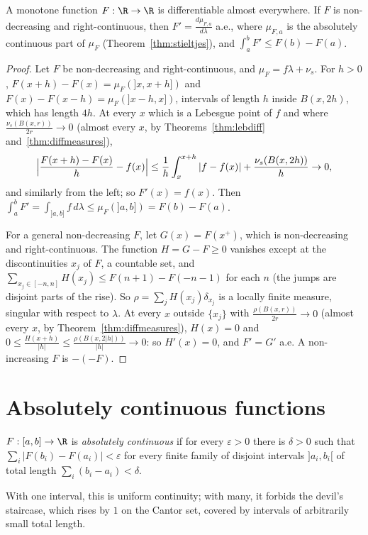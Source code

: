 \begin{theorem}[Lebesgue, 1904]\label{thm:monotone}
A monotone function $F:\R\to\R$ is differentiable almost everywhere. If $F$ is non-decreasing and right-continuous, then $F'=\frac{d\mu_{F,a}}{d\lambda}$ a.e., where $\mu_{F,a}$ is the absolutely continuous part of
$\mu_F$ (Theorem~\ref{thm:stieltjes}), and $\int_a^bF'\le F(b)-F(a)$.
\end{theorem}
\begin{proof}
Let $F$ be non-decreasing and right-continuous, and $\mu_F=f\lambda+\nu_s$. For $h>0$, $F(x+h)-F(x)=\mu_F(]x,x+h])$ and $F(x)-F(x-h)=\mu_F(]x-h,x])$, intervals of length $h$ inside $B(x,2h)$, which has length $4h$. At every $x$ which is a Lebesgue point of $f$ and where $\frac{\nu_s(B(x,r))}{2r}\to0$ (almost every $x$, by Theorems~\ref{thm:lebdiff} and~\ref{thm:diffmeasures}),
\[\Bigl|\frac{F(x+h)-F(x)}h-f(x)\Bigr|\le\frac1h\int_x^{x+h}|f-f(x)|+\frac{\nu_s(B(x,2h))}h\to0,\]
and similarly from the left; so $F'(x)=f(x)$. Then $\int_a^bF'=\int_{]a,b]}f\,d\lambda\le\mu_F(]a,b])=F(b)-F(a)$.

For a general non-decreasing $F$, let $G(x)=F(x^+)$, which is non-decreasing and right-continuous. The function $H=G-F\ge0$ vanishes except at the discontinuities $x_j$ of $F$, a countable set, and
$\sum_{x_j\in[-n,n]}H(x_j)\le F(n+1)-F(-n-1)$ for each $n$ (the jumps are disjoint parts of the rise). So $\rho=\sum_jH(x_j)\delta_{x_j}$ is a locally finite measure, singular with respect to $\lambda$. At every $x$
outside $\{x_j\}$ with $\frac{\rho(B(x,r))}{2r}\to0$ (almost every $x$, by Theorem~\ref{thm:diffmeasures}), $H(x)=0$ and $0\le\frac{H(x+h)}{|h|}\le\frac{\rho(B(x,2|h|))}{|h|}\to0$: so $H'(x)=0$, and $F'=G'$ a.e. A non-increasing $F$ is
$-(-F)$.
\end{proof}

\section{Absolutely continuous functions}

\begin{definition}
$F:[a,b]\to\R$ is \emph{absolutely continuous} if for every $\varepsilon>0$ there is $\delta>0$ such that $\sum_i|F(b_i)-F(a_i)|<\varepsilon$ for every finite family of disjoint intervals $]a_i,b_i[$ of total length
$\sum_i(b_i-a_i)<\delta$.
\end{definition}

With one interval, this is uniform continuity; with many, it forbids the devil's staircase, which rises by $1$ on the Cantor set, covered by intervals of arbitrarily small total length.


